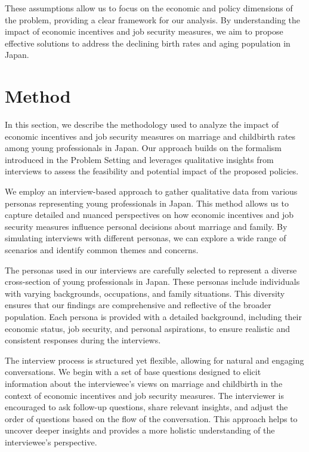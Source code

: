 \documentclass{article} %
\begin{document}
These assumptions allow us to focus on the economic and policy dimensions of the problem, providing a clear framework for our analysis. By understanding the impact of economic incentives and job security measures, we aim to propose effective solutions to address the declining birth rates and aging population in Japan.

\section{Method}
\label{sec:method}

In this section, we describe the methodology used to analyze the impact of economic incentives and job security measures on marriage and childbirth rates among young professionals in Japan. Our approach builds on the formalism introduced in the Problem Setting and leverages qualitative insights from interviews to assess the feasibility and potential impact of the proposed policies.

We employ an interview-based approach to gather qualitative data from various personas representing young professionals in Japan. This method allows us to capture detailed and nuanced perspectives on how economic incentives and job security measures influence personal decisions about marriage and family. By simulating interviews with different personas, we can explore a wide range of scenarios and identify common themes and concerns.

The personas used in our interviews are carefully selected to represent a diverse cross-section of young professionals in Japan. These personas include individuals with varying backgrounds, occupations, and family situations. This diversity ensures that our findings are comprehensive and reflective of the broader population. Each persona is provided with a detailed background, including their economic status, job security, and personal aspirations, to ensure realistic and consistent responses during the interviews.

The interview process is structured yet flexible, allowing for natural and engaging conversations. We begin with a set of base questions designed to elicit information about the interviewee's views on marriage and childbirth in the context of economic incentives and job security measures. The interviewer is encouraged to ask follow-up questions, share relevant insights, and adjust the order of questions based on the flow of the conversation. This approach helps to uncover deeper insights and provides a more holistic understanding of the interviewee's perspective.
\end{document}
